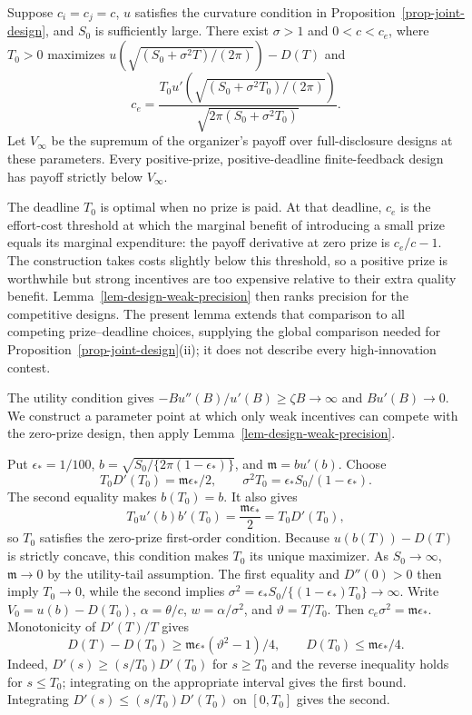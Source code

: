 \documentclass[mnsc]{informs3}
\begin{document}
\begin{APPENDICES}
{\begin{lemma}\label{lem-design-output-bound}
Suppose $c_i=c_j=c$, $u$ satisfies the curvature condition in
Proposition~\ref{prop-joint-design}, and $S_0$ is sufficiently large.
There exist $\sigma>1$ and $0<c<c_e$, where $T_0>0$ maximizes
$u(\sqrt{(S_0+\sigma^2T)/(2\pi)})-D(T)$ and
\[
c_e=\frac{T_0u'(\sqrt{(S_0+\sigma^2T_0)/(2\pi)})}
{\sqrt{2\pi(S_0+\sigma^2T_0)}}.
\]
Let $V_\infty$ be the supremum of the organizer's payoff over
full-disclosure designs at these parameters.
Every positive-prize, positive-deadline finite-feedback design has
payoff strictly below $V_\infty$.
\end{lemma}

The deadline $T_0$ is optimal when no prize is paid. At that deadline, $c_e$ is the effort-cost threshold at which the marginal benefit of introducing a small prize equals its marginal expenditure: the payoff derivative at zero prize is $c_e/c-1$. The construction takes costs slightly below this threshold, so a positive prize is worthwhile but strong incentives are too expensive relative to their extra quality benefit. Lemma~\ref{lem-design-weak-precision} then ranks precision for the competitive designs. The present lemma extends that comparison to all competing prize--deadline choices, supplying the global comparison needed for Proposition~\ref{prop-joint-design}(ii); it does not describe every high-innovation contest.

The utility condition gives $-Bu''(B)/u'(B)\geq\zeta B\to\infty$
and $Bu'(B)\to0$.
We construct a parameter point at which only weak incentives can compete
with the zero-prize design, then apply Lemma~\ref{lem-design-weak-precision}.

Put ${\epsilon_*}=1/100$, $b=\sqrt{S_0/\{2\pi(1-{\epsilon_*})\}}$, and ${\mathfrak m}=bu'(b)$.
Choose
\[
T_0D'(T_0)={\mathfrak m}{\epsilon_*}/2,\qquad \sigma^2T_0={\epsilon_*}S_0/(1-{\epsilon_*}).
\]
The second equality makes $b(T_0)=b$. It also gives
\[
T_0u'(b)b'(T_0)=\frac{{\mathfrak m}{\epsilon_*}}{2}=T_0D'(T_0),
\]
so $T_0$ satisfies the zero-prize first-order condition. Because
$u(b(T))-D(T)$ is strictly concave, this condition makes $T_0$ its unique
maximizer. As $S_0\to\infty$, ${\mathfrak m}\to0$ by the utility-tail assumption.
The first equality and $D''(0)>0$ then imply $T_0\to0$, while the second
implies $\sigma^2={\epsilon_*}S_0/\{(1-{\epsilon_*})T_0\}\to\infty$.
Write $V_0=u(b)-D(T_0)$, $\alpha=\theta/c$,
$w=\alpha/\sigma^2$, and ${\vartheta}=T/T_0$. Then $c_e\sigma^2={\mathfrak m}{\epsilon_*}$.
Monotonicity of $D'(T)/T$ gives
\[
D(T)-D(T_0)\geq {\mathfrak m}{\epsilon_*}({\vartheta}^2-1)/4,\qquad D(T_0)\leq {\mathfrak m}{\epsilon_*}/4.
\]
Indeed, $D'(s)\geq(s/T_0)D'(T_0)$ for $s\geq T_0$ and the reverse
inequality holds for $s\leq T_0$; integrating on the appropriate interval
gives the first bound. Integrating
$D'(s)\leq(s/T_0)D'(T_0)$ on $[0,T_0]$ gives the second.

}
\end{APPENDICES}
\end{document}
